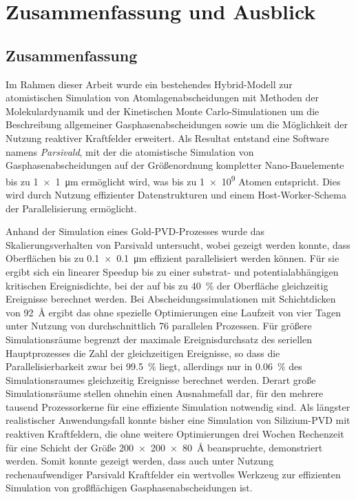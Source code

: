 \chapter{Zusammenfassung und Ausblick}
\label{summary}


\section{Zusammenfassung}

Im Rahmen dieser Arbeit wurde ein bestehendes Hybrid-Modell zur atomistischen Simulation von Atomlagenabscheidungen mit Methoden der Molekulardynamik und der Kinetischen Monte Carlo-Simulationen um die Beschreibung allgemeiner Gasphasenabscheidungen sowie um die Möglichkeit der Nutzung reaktiver Kraftfelder erweitert.
Als Resultat entstand eine Software namens \textit{Parsivald}, mit der die atomistische Simulation von Gasphasenabscheidungen auf der Größenordnung kompletter Nano-Bauelemente bis zu \SI{1x1}{\micro\meter} ermöglicht wird, was bis zu \num{1e9} Atomen entspricht.
Dies wird durch Nutzung effizienter Datenstrukturen und einem Host-Worker-Schema der Parallelisierung ermöglicht.


Anhand der Simulation eines Gold-PVD-Prozesses wurde das Skalierungsverhalten von Parsivald untersucht, wobei gezeigt werden konnte, dass Oberflächen bis zu \SI{0.1x0.1}{\micro\meter} effizient parallelisiert werden können.
Für sie ergibt sich ein linearer Speedup bis zu einer substrat- und potentialabhängigen kritischen Ereignisdichte, bei der auf bis zu \SI{40}{\percent} der Oberfläche gleichzeitig Ereignisse berechnet werden.
Bei Abscheidungssimulationen mit Schichtdicken von \SI{92}{\angstrom} ergibt das ohne spezielle Optimierungen eine Laufzeit von vier Tagen unter Nutzung von durchschnittlich \num{76} parallelen Prozessen.
Für größere Simulationsräume begrenzt der maximale Ereignisdurchsatz des seriellen Hauptprozesses die Zahl der gleichzeitigen Ereignisse, so dass die Parallelisierbarkeit zwar bei \SI{99.5}{\percent} liegt, allerdings nur in \SI{0.06}{\percent} des Simulationsraumes gleichzeitig Ereignisse berechnet werden.
Derart große Simulationsräume stellen ohnehin einen Ausnahmefall dar, für den mehrere tausend Prozessorkerne für eine effiziente Simulation notwendig sind.
Als längster realistischer Anwendungsfall konnte bisher eine Simulation von Silizium-PVD mit reaktiven Kraftfeldern, die ohne weitere Optimierungen drei Wochen Rechenzeit für eine Schicht der Größe \SI{200x200x80}{\angstrom} beanspruchte, demonstriert werden.
Somit konnte gezeigt werden, dass auch unter Nutzung rechenaufwendiger Parsivald Kraftfelder ein wertvolles Werkzeug zur effizienten Simulation von großflächigen Gasphasenabscheidungen ist.


